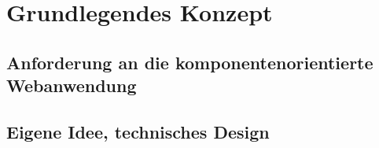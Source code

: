 \chapter{Grundlegendes Konzept}

\section{Anforderung an die komponentenorientierte Webanwendung}

\section{Eigene Idee, technisches Design}
